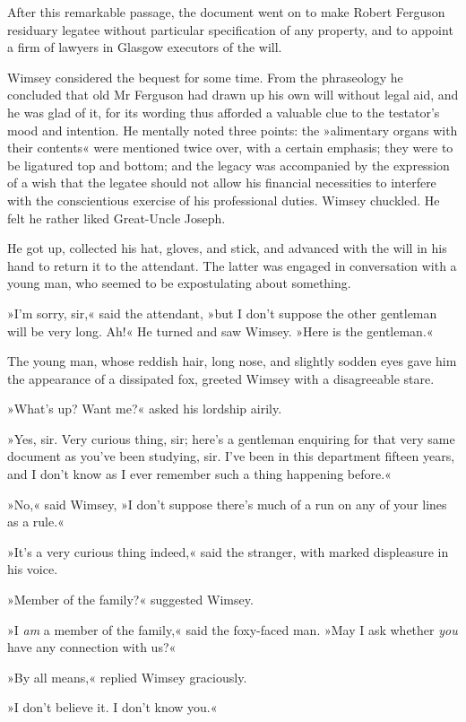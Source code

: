 After this remarkable passage, the document went on to make Robert Ferguson residuary legatee without particular specification of any property, and to appoint a firm of lawyers in Glasgow executors of the will.

Wimsey considered the bequest for some time. From the phraseology he concluded that old Mr Ferguson had drawn up his own will without legal aid, and he was glad of it, for its wording thus afforded a valuable clue to the testator's mood and intention. He mentally noted three points: the »alimentary organs with their contents« were mentioned twice over, with a certain emphasis; they were to be ligatured top and bottom; and the legacy was accompanied by the expression of a wish that the legatee should not allow his financial necessities to interfere with the conscientious exercise of his professional duties. Wimsey chuckled. He felt he rather liked Great-Uncle Joseph.

He got up, collected his hat, gloves, and stick, and advanced with the will in his hand to return it to the attendant. The latter was engaged in conversation with a young man, who seemed to be expostulating about something.

»I'm sorry, sir,« said the attendant, »but I don't suppose the other gentleman will be very long. Ah!« He turned and saw Wimsey. »Here is the gentleman.«

The young man, whose reddish hair, long nose, and slightly sodden eyes gave him the appearance of a dissipated fox, greeted Wimsey with a disagreeable stare.

»What's up? Want me?« asked his lordship airily.

»Yes, sir. Very curious thing, sir; here's a gentleman enquiring for that very same document as you've been studying, sir. I've been in this department fifteen years, and I don't know as I ever remember such a thing happening before.«

»No,« said Wimsey, »I don't suppose there's much of a run on any of your lines as a rule.«

»It's a very curious thing indeed,« said the stranger, with marked displeasure in his voice.

»Member of the family?« suggested Wimsey.

»I \textit{am} a member of the family,« said the foxy-faced man. »May I ask whether \textit{you} have any connection with us?«

»By all means,« replied Wimsey graciously.

»I don't believe it. I don't know you.«

